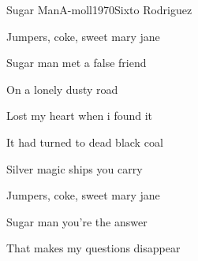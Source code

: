 \documentclass[a4paper,draft]{book}
\begin{document}
\begin{song}{Sugar Man}{A-moll}{1970}{Sixto Rodriguez}{}{}
\begin{SBChorus}
	Jumpers, coke, sweet mary jane
\end{SBChorus}

\begin{SBVerse}
	Sugar man met a false friend

	On a lonely dusty road

	Lost my heart when i found it

	It had turned to dead black coal
\end{SBVerse}

\begin{SBChorus}
	Silver magic ships you carry

	Jumpers, coke, sweet mary jane
\end{SBChorus}

\begin{SBVerse}
	Sugar man you're the answer

	That makes my questions disappear
\end{SBVerse}
\end{song}
\end{document}
